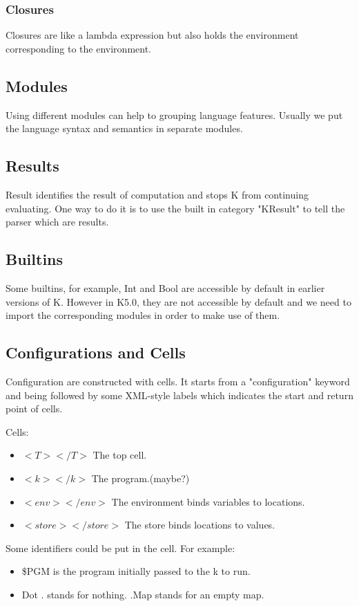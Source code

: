 \documentclass[a4paper]{article}
\begin{document}
\subsubsection{Closures}
Closures are like a lambda expression but also holds the environment corresponding to the environment.

\subsection{Modules}
Using different modules can help to grouping language features. Usually we put the language syntax and semantics in separate modules. 

\subsection{Results}
Result identifies the result of computation and stops K from continuing evaluating. One way to do it is to use the built in category "KResult" to tell the parser which are results. 

\subsection{Builtins}
Some builtins, for example, Int and Bool are accessible by default in earlier versions of K. However in K5.0, they are not accessible by default and we need to import the corresponding modules in order to make use of them.

\subsection{Configurations and Cells}
Configuration are constructed with cells. It starts from a "configuration" keyword and being followed by some XML-style labels which indicates the start and return point of cells.

Cells:
\begin{itemize}
    \item $<T></T>$   The top cell.
    \item $<k></k>$   The program.(maybe?)
    \item $<env></env>$   The environment binds variables to locations.
    \item $<store></store>$   The store binds locations to values.
\end{itemize}

Some identifiers could be put in the cell. For example:
\begin{itemize}
    \item \$PGM is the program initially passed to the k to run.
    \item Dot . stands for nothing. .Map stands for an empty map.
\end{itemize}
\end{document}
